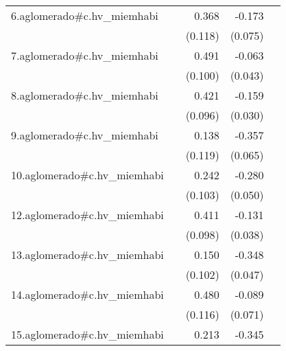 {\begin{longtable}{l*{4}{D{.}{.}{-1}}}
\addlinespace
6.aglomerado#c.hv\_miemhabi&                     &       0.368\sym{**} &      -0.173\sym{*}  &                     \\
            &                     &     (0.118)         &     (0.075)         &                     \\
\addlinespace
7.aglomerado#c.hv\_miemhabi&                     &       0.491\sym{***}&      -0.063         &                     \\
            &                     &     (0.100)         &     (0.043)         &                     \\
\addlinespace
8.aglomerado#c.hv\_miemhabi&                     &       0.421\sym{***}&      -0.159\sym{***}&                     \\
            &                     &     (0.096)         &     (0.030)         &                     \\
\addlinespace
9.aglomerado#c.hv\_miemhabi&                     &       0.138         &      -0.357\sym{***}&                     \\
            &                     &     (0.119)         &     (0.065)         &                     \\
\addlinespace
10.aglomerado#c.hv\_miemhabi&                     &       0.242\sym{*}  &      -0.280\sym{***}&                     \\
            &                     &     (0.103)         &     (0.050)         &                     \\
\addlinespace
12.aglomerado#c.hv\_miemhabi&                     &       0.411\sym{***}&      -0.131\sym{***}&                     \\
            &                     &     (0.098)         &     (0.038)         &                     \\
\addlinespace
13.aglomerado#c.hv\_miemhabi&                     &       0.150         &      -0.348\sym{***}&                     \\
            &                     &     (0.102)         &     (0.047)         &                     \\
\addlinespace
14.aglomerado#c.hv\_miemhabi&                     &       0.480\sym{***}&      -0.089         &                     \\
            &                     &     (0.116)         &     (0.071)         &                     \\
\addlinespace
15.aglomerado#c.hv\_miemhabi&                     &       0.213         &      -0.345\sym{***}&                     \\

\end{longtable}}
